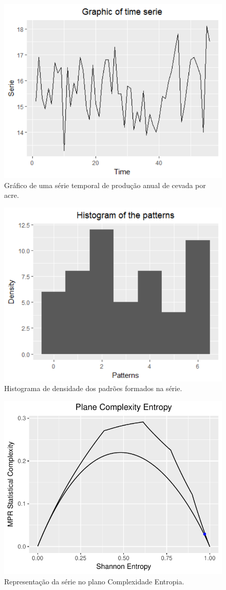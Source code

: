 \documentclass[journal,a4paper,11pt]{IEEEtran}
\begin{document}
\begin{figure}[hbt]
 \centering
 \includegraphics[width=0.7\columnwidth]{Rplot}
 \caption{Gráfico de uma série temporal de produção anual de cevada por acre.} \end{figure}


\begin{figure}[!hbt]
	\centering
	\includegraphics[width=0.7\columnwidth]{Rplot02}        
     \caption{Histograma de densidade dos padrões formados na série.}
\end{figure}


\begin{figure}[!hbt]
	\centering
	\includegraphics[width=0.7\columnwidth]{Rplot3}        
     \caption{Representação da série no plano Complexidade Entropia.}
\end{figure}
\end{document}
